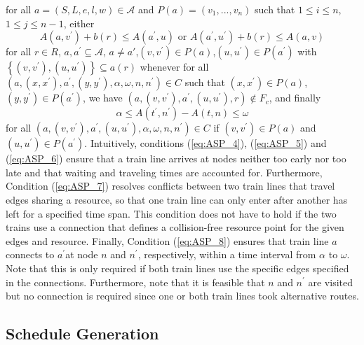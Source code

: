 \documentclass{article}
\begin{document}
for all $a= (S, L, e, l, w)\in\mathcal{A}$ and $P(a) = (v_1, . . . , v_n)$ such that $1\leq i\leq n$,$1\leq j\leq n-1$,
either
\begin{equation}
A(a, v^\prime) +b(r) \leq A(a^\prime, u) \textrm{ or }A(a^\prime, u^\prime) +b(r)\leq A(a, v) \label{eq:ASP_7}
\end{equation}
for all $r\in R$, ${a, a^\prime} \subseteq \mathcal{A}$, $a\not=a'$,$(v, v^\prime)\in P(a)$,$(u, u^\prime)\in P(a^\prime)$ with $\left\{(v, v^\prime),(u, u^\prime)\right\} \subseteq a(r)$ whenever for all $(a,(x, x^\prime), a^\prime,(y, y^\prime), \alpha, \omega, n, n^\prime)\in C$ such that $(x, x^\prime)\in P(a)$,$(y, y^\prime)\in P(a^\prime)$, we have $(a,(v, v^\prime), a^\prime,(u, u^\prime), r)\not\in F_c$, and finally
\begin{equation}
\alpha\leq A(t^\prime, n^\prime)-A(t, n)\leq \omega\label{eq:ASP_8}
\end{equation}
for all $(a,(v, v^\prime), a^\prime,(u, u^\prime), \alpha, \omega, n, n^\prime)\in C$ if $(v, v^\prime)\in P(a)$ and $(u, u^\prime)\in P(a^\prime)$.
%
Intuitively, conditions (\ref{eq:ASP_4}), (\ref{eq:ASP_5}) and (\ref{eq:ASP_6}) ensure that a train line arrives at nodes neither too early nor too late and that waiting and traveling times are accounted for. Furthermore, Condition (\ref{eq:ASP_7}) resolves conflicts between two train lines that travel edges sharing a resource, so that one train line can only enter after another has left for a specified time span. This condition does not have to hold if the two trains use a connection that defines a collision-free resource point for the given edges and resource. Finally, Condition (\ref{eq:ASP_8}) ensures that train line $a$ connects to $a^\prime$at node $n$ and $n^\prime$, respectively, within a time interval from $\alpha$ to $\omega$. Note that this is only required if both train lines use the specific edges specified in the connections. Furthermore, note that it is feasible that $n$ and $n^\prime$ are visited but no connection is required since one or both train lines took alternative routes.





\subsection{Schedule Generation}\label{subsubsec:schedulegeneration}
\end{document}
